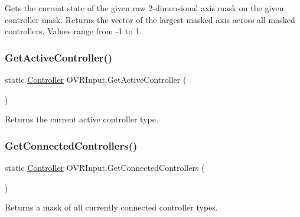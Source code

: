 Gets the current state of the given raw 2-\/dimensional axis mask on the given controller mask. Returns the vector of the largest masked axis across all masked controllers. Values range from -\/1 to 1. 

\mbox{\label{class_o_v_r_input_aac9caffc4a6ddf1d467ed3cb63bc0db2}} 
\subsubsection{\texorpdfstring{Get\+Active\+Controller()}{GetActiveController()}}
{\footnotesize\ttfamily static \mbox{\hyperlink{class_o_v_r_input_a5c86f9052a9cbb0b73779ff5704d60a8}{Controller}} O\+V\+R\+Input.\+Get\+Active\+Controller (\begin{DoxyParamCaption}{ }\end{DoxyParamCaption})\hspace{0.3cm}{\ttfamily [static]}}



Returns the current active controller type. 

\mbox{\label{class_o_v_r_input_a057e31053088d33555d5465313929148}} 
\subsubsection{\texorpdfstring{Get\+Connected\+Controllers()}{GetConnectedControllers()}}
{\footnotesize\ttfamily static \mbox{\hyperlink{class_o_v_r_input_a5c86f9052a9cbb0b73779ff5704d60a8}{Controller}} O\+V\+R\+Input.\+Get\+Connected\+Controllers (\begin{DoxyParamCaption}{ }\end{DoxyParamCaption})\hspace{0.3cm}{\ttfamily [static]}}



Returns a mask of all currently connected controller types. 

\mbox{\label{class_o_v_r_input_abed7e5330bf1ef803f06728c48e2aa14}} 
